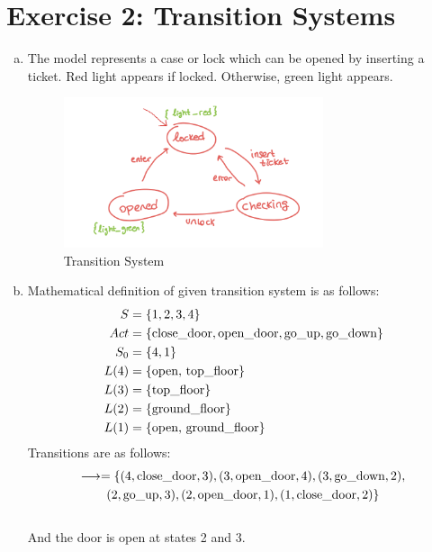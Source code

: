 \documentclass{article}
\begin{document}
\newpage

\section*{Exercise 2: Transition Systems}
\begin{enumerate}[(a)]
    \item{The model represents a case or lock which can be opened by inserting a ticket. Red light appears if locked. Otherwise, green light appears.}
    \begin{figure}[!htb]
        \centering
        \includegraphics[width=3in]{images/2a.png}
        \caption{Transition System}
        \label{fig:2a}
    \end{figure}

    \item{Mathematical definition of given transition system is as follows:}
        \begin{equation*}
        \centering
            \begin{split}
                S &= \{1,2,3,4\} \\
                Act &= \{\text{close\textunderscore door}, \text{open\textunderscore door}, \text{go\textunderscore up}, \text{go\textunderscore down}\}\\
                S_0 &= \{4, 1\}\\
                L(4) &= \{\text{open, top\textunderscore floor}\}\\
                L(3) &= \{\text{top\textunderscore floor}\}\\
                L(2) &= \{\text{ground\textunderscore floor}\}\\
                L(1) &= \{\text{open, ground\textunderscore floor}\}\\
            \end{split}
        \end{equation*}
        Transitions are as follows:\\
        \begin{multline*}
        \longrightarrow = \{
        (4, \text{close\textunderscore door}, 3), (3, \text{open\textunderscore door}, 4), (3, \text{go\textunderscore down}, 2),\\
        (2, \text{go\textunderscore up}, 3), (2, \text{open\textunderscore door}, 1), (1, \text{close\textunderscore door}, 2)\} 
        \end{multline*}    
        \\
        And the door is open at states 2 and 3.
\end{enumerate}
\end{document}
